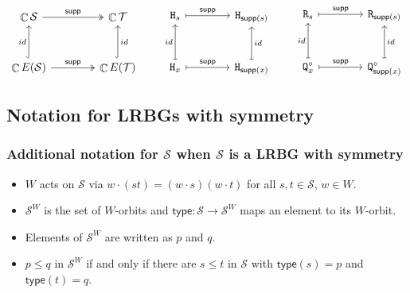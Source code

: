 \documentclass[11pt, oneside, reqno]{amsart}
\theoremstyle{definition}
\numberwithin{equation}{section}
\DeclareMathOperator{\C}{\mathbb{C}}
\def \SS{{\mathcal{S}}}
\def \TT{{\mathcal{T}}}
\def \kk{\C}
\def \supp{\mathsf{supp}}
\def \type{\mathsf{type}}
\newcommand{\B}[1]{\mathtt{#1}} 			%
\begin{document}
\begin{equation*}
    \begin{tikzcd}[row sep=3em, column sep=4em]
        \kk \SS \arrow[r, two heads, "\supp"] & \kk \TT \\
        \kk E(\SS) \arrow[u, hook, "id"] \arrow[r, two heads, "\supp"] & \kk E(\TT) \ar[u, hook, "id"']
    \end{tikzcd}
    \qquad
    \begin{tikzcd}[row sep=3em, column sep=4em]
           \B{H}_{s} \arrow[r, mapsto, "\supp"]
           &
           \B{H}_{\supp(s)} \\
           \B{H}_{x} \arrow[u, mapsto, "id"] \arrow[r, mapsto, "\supp"]
           &
           \B{H}_{\supp(x)} \arrow[u, mapsto, "id"']
    \end{tikzcd}
    \qquad
    \begin{tikzcd}[row sep=3em, column sep=4em]
           \B{R}_{s} \arrow[r, mapsto, "\supp"]
           &
           \B{R}_{\supp(s)} \\
           \B{Q}^\circ_{x} \arrow[u, mapsto, "id"] \arrow[r, mapsto, "\supp"]
           &
           \B{Q}^\circ_{\supp(x)} \arrow[u, mapsto, "id"']
    \end{tikzcd}
\end{equation*}

\subsection*{Notation for LRBGs with symmetry}\label{s:appendix-notation}

\subsubsection*{Additional notation for $\SS$ when $\SS$ is a LRBG with symmetry}

\begin{itemize}[wide]
    \item
        $W$ acts on $\SS$ via $w \cdot (st) = (w \cdot s)(w \cdot t)$ for all $s, t \in \SS$, $w \in W$.

    \item
        $\SS^W$ is the set of $W$-orbits and $\type: \SS \to \SS^W$ maps an element to its $W$-orbit.

    \item
        Elements of $\SS^W$ are written as $p$ and $q$.


    \item
        $p \leq q$ in $\SS^W$ if and only if there are $s \leq t$ in $\SS$
        with $\type(s) = p$ and $\type(t) = q$.
\end{itemize}
\end{document}
